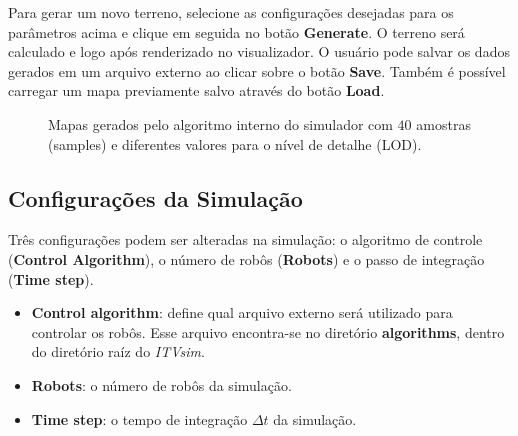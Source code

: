 \documentclass[11pt,a4paper]{article}
\begin{document}
Para gerar um novo terreno, selecione as configurações desejadas para
os parâmetros acima e clique em seguida no botão \textbf{Generate}. O
terreno será calculado e logo após renderizado no visualizador. O
usuário pode salvar os dados gerados em um arquivo externo ao clicar
sobre o botão \textbf{Save}. Também é possível carregar um mapa
previamente salvo através do botão \textbf{Load}.

\begin{figure}[htpb]
  \centering
  \caption{Mapas gerados pelo algoritmo interno do simulador com $40$
    amostras (samples) e diferentes valores para o nível de detalhe
    (LOD).}
  \label{fig:lod}
\end{figure}

\subsection{Configurações da Simulação}

Três configurações podem ser alteradas na simulação: o algoritmo de
controle (\textbf{Control Algorithm}), o número de robôs
(\textbf{Robots}) e o passo de integração (\textbf{Time step}).

\begin{itemize}
\item \textbf{Control algorithm}: define qual arquivo externo será
  utilizado para controlar os robôs. Esse arquivo encontra-se no
  diretório \textbf{algorithms}, dentro do diretório raíz do
  \textit{ITVsim}.
\item \textbf{Robots}: o número de robôs da simulação.
\item \textbf{Time step}: o tempo de integração $\Delta t$ da simulação.
\end{itemize}
\end{document}
